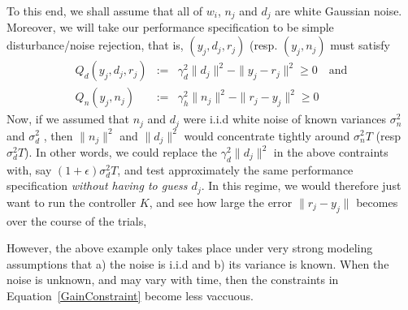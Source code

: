\documentclass[11pt]{article} %
\theoremstyle{plain}
\theoremstyle{definition}
\theoremstyle{remark}
\begin{document}
To this end, we shall assume that all of $w_i$, $n_j$ and $d_j$ are white Gaussian noise. Moreover, we will take our performance specification to be simple disturbance/noise rejection, that is,  $(y_j,d_j,r_j)$ (resp. $(y_j,n_j)$ must satisfy
\begin{eqnarray}\label{GainConstraint}
Q_{d}(y_j,d_j,r_j) &:=& \gamma_d^2\|d_j\|^2 - \|y_j - r_j\|^2 \ge 0 \quad \text{and} \\
Q_{n}(y_j,n_j) &:=& \gamma_h^2\|n_j\|^2 - \|r_j - y_j\|^2 \ge 0
\end{eqnarray}
Now, if we assumed that $n_j$ and $d_j$ were i.i.d white noise of known variances $\sigma_n^2$ and $\sigma_d^2$ , then $\|n_j\|^2$ and $\|d_j\|^2$ would concentrate tightly around $\sigma_n^2T$ (resp $\sigma_d^2T$). In other words, we could replace the $\gamma_d^2\|d_j\|^2$  in the above contraints with, say $(1+\epsilon)\sigma_d^2T$, and test approximately the same performance specification \emph{without having to guess $d_j$}. In this regime, we would therefore just want to run the controller $K$, and see how large the error $\|r_j-y_j\|$ becomes over the course of the trials,

However, the above example only takes place under very strong modeling assumptions that a) the noise is i.i.d and b) its variance is known. When the noise is unknown, and may vary with time, then the constraints in Equation~\ref{GainConstraint} become less vaccuous. 
\end{document}
